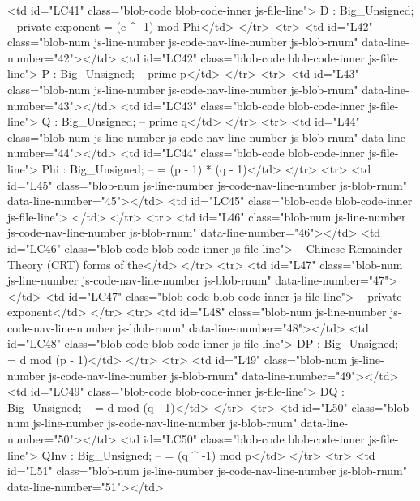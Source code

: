           <td id="LC41" class="blob-code blob-code-inner js-file-line">    D    : Big_Unsigned; -- private exponent = (e ^ -1) mod Phi</td>
        </tr>
        <tr>
          <td id="L42" class="blob-num js-line-number js-code-nav-line-number js-blob-rnum" data-line-number="42"></td>
          <td id="LC42" class="blob-code blob-code-inner js-file-line">    P    : Big_Unsigned; -- prime p</td>
        </tr>
        <tr>
          <td id="L43" class="blob-num js-line-number js-code-nav-line-number js-blob-rnum" data-line-number="43"></td>
          <td id="LC43" class="blob-code blob-code-inner js-file-line">    Q    : Big_Unsigned; -- prime q</td>
        </tr>
        <tr>
          <td id="L44" class="blob-num js-line-number js-code-nav-line-number js-blob-rnum" data-line-number="44"></td>
          <td id="LC44" class="blob-code blob-code-inner js-file-line">    Phi  : Big_Unsigned; -- = (p - 1) * (q - 1)</td>
        </tr>
        <tr>
          <td id="L45" class="blob-num js-line-number js-code-nav-line-number js-blob-rnum" data-line-number="45"></td>
          <td id="LC45" class="blob-code blob-code-inner js-file-line">
</td>
        </tr>
        <tr>
          <td id="L46" class="blob-num js-line-number js-code-nav-line-number js-blob-rnum" data-line-number="46"></td>
          <td id="LC46" class="blob-code blob-code-inner js-file-line">    --  Chinese Remainder Theory (CRT) forms of the</td>
        </tr>
        <tr>
          <td id="L47" class="blob-num js-line-number js-code-nav-line-number js-blob-rnum" data-line-number="47"></td>
          <td id="LC47" class="blob-code blob-code-inner js-file-line">    --  private exponent</td>
        </tr>
        <tr>
          <td id="L48" class="blob-num js-line-number js-code-nav-line-number js-blob-rnum" data-line-number="48"></td>
          <td id="LC48" class="blob-code blob-code-inner js-file-line">    DP   : Big_Unsigned; -- = d mod (p - 1)</td>
        </tr>
        <tr>
          <td id="L49" class="blob-num js-line-number js-code-nav-line-number js-blob-rnum" data-line-number="49"></td>
          <td id="LC49" class="blob-code blob-code-inner js-file-line">    DQ   : Big_Unsigned; -- = d mod (q - 1)</td>
        </tr>
        <tr>
          <td id="L50" class="blob-num js-line-number js-code-nav-line-number js-blob-rnum" data-line-number="50"></td>
          <td id="LC50" class="blob-code blob-code-inner js-file-line">    QInv : Big_Unsigned; -- = (q ^ -1) mod p</td>
        </tr>
        <tr>
          <td id="L51" class="blob-num js-line-number js-code-nav-line-number js-blob-rnum" data-line-number="51"></td>

